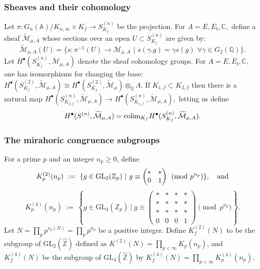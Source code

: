 \documentclass[11pt]{amsart}
\newcommand{\Q}{\mathbb Q}
\newcommand{\Z}{\mathbb Z}
\newcommand{\GL}{\mathrm{GL}}
\begin{document}
\subsubsection{Sheaves and their cohomology}
Let $\pi: G_n(\mathbb{A})/ K_{n,\infty}\times K_f \rightarrow S^{(n)}_{K_f}$ be the projection. 
For $A= E, E_\mathfrak{l}, \mathbb{C},$ define a sheaf $\widetilde{\mathcal{M}}_{\mu,A}$
whose sections over an open $U \subset S^{(n)}_{K_f}$ are given by:
\begin{equation*}
	\widetilde{\mathcal{M}}_{\mu,A}(U) = \{ s: \pi^{-1}(U)\rightarrow\mathcal{M}_{\mu,A}\,\,|\,\, s(\gamma. g) = \gamma s(g)\,\, \forall \gamma \in G_2(\mathbb{Q})\}.
\end{equation*}
Let $H^\bullet (S^{(n)}_{K_f}, \widetilde{\mathcal{M}}_{\mu,A})$ denote the sheaf cohomology groups. 
For $A= E, E_\mathfrak{l}, \mathbb{C},$ one has isomorphisms for changing the base: 
$H^\bullet (S^{(2)}_{K_f}, \widetilde{\mathcal{M}}_{\mu,A}) \cong H^\bullet (S^{(2)}_{K_f}, \widetilde{\mathcal{M}}_{\mu})\otimes_\Q A.$
If $K_{1,f} \subset K_{2,f}$ then there is a natural map 
$H^\bullet (S^{(n)}_{K_{2,f}}, \widetilde{\mathcal{M}}_{\mu,A}) \rightarrow H^\bullet (S^{(n)}_{K_{1,f}}, \widetilde{\mathcal{M}}_{\mu,A}),$ letting us  
define
\[ H^\bullet (S^{(n)}, \widetilde{\mathcal{M}}_{\mu,A}) = \textup{colim}_{\substack{K_f}} H^\bullet (S^{(n)}_{K_f}, \widetilde{\mathcal{M}}_{\mu,A}).\]


\subsubsection{The mirahoric congruence subgroups}
For a prime $p$ and an integer $n_p \geq 0$, define  
$$
K_p^{(2)}(n_p) \ := \ 
\{ g \in \GL_2(\Z_p) \ | \ g \equiv \begin{pmatrix} * & * \\ 0 & 1 \end{pmatrix} \pmod{p^{n_p}} \}, \quad {\rm and}
$$
$$
K_p^{(4)}({n_p}) \ := \ 
\left\{ g \in \GL_4(\Z_p) \ | \ g \equiv \begin{pmatrix}
	* & * & * & * \\ * & * & * & * \\ * & * & * & * \\ 0 & 0 & 0 & 1 \end{pmatrix} \pmod{p^{n_p}} \right\}.
$$
Let $N = \prod_p p^{v_p(N)} = \prod_p p^{n_p}$ be a positive integer. Define 
$K_f^{(2)}(N)$ to be the subgroup of $\GL_2(\hat{\mathbb{Z}})$ defined as $K^{(2)}(N) = \prod_{p<\infty } K_p(n_p)$, and  
$K_f^{(4)}(N)$ be the subgroup of $\GL_4(\hat{\mathbb{Z}})$ by $K_f^{(4)}(N) = \prod_{p<\infty } K_p^{(4)}(n_p)$. 
 
\end{document}
